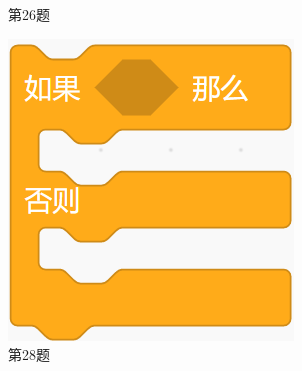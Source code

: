 \documentclass[10pt, a4paper]{article}
\begin{document}
\begin{enumerate}
\begin{figure}[htbp]
\begin{minipage}[t]{.1\textwidth}
                \caption*{第26题}
            \end{minipage}
            \begin{minipage}[t]{.15\textwidth}
                \centering
                \includegraphics[width=\textwidth]{28.png}
                \caption*{第28题}
            \end{minipage}
        \end{figure}
    \end{enumerate}
\end{document}
